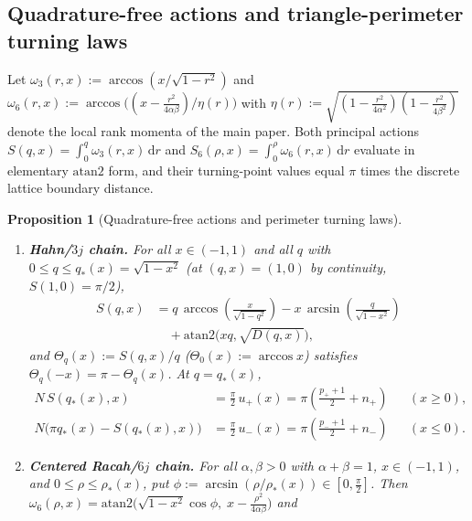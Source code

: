 \documentclass[11pt]{article}
\newtheorem{proposition}[theorem]{Proposition}
\theoremstyle{definition}
\theoremstyle{remark}
\newcommand{\dd}{\mathrm{d}}
\newcommand{\atanTwo}{\mathrm{atan2}}
\renewcommand{\_}{\oldunderscore\penalty0\hskip0pt\relax}
\begin{document}
\subsection{Quadrature-free actions and triangle-perimeter turning laws}
Let $\omega_3(r,x):=\arccos(x/\sqrt{1-r^2})$ and $\omega_6(r,x):=\arccos\bigl((x-\frac{r^2}{4\alpha\beta})/\eta(r)\bigr)$ with
  $\eta(r):=\sqrt{(1-\frac{r^2}{4\alpha^2})(1-\frac{r^2}{4\beta^2})}$ denote the local rank momenta of the main paper. Both principal
  actions $S(q,x)=\int_0^q\omega_3(r,x)\,\dd r$ and $S_6(\rho,x)=\int_0^\rho\omega_6(r,x)\,\dd r$ evaluate in elementary
  $\atanTwo$ form, and their turning-point values equal $\pi$ times the discrete lattice boundary distance.

\begin{proposition}[Quadrature-free actions and perimeter turning laws]
\label{prop:perimeter-laws}
\begin{enumerate}[label=(\alph*),leftmargin=2em,itemsep=3pt]
\item \textbf{Hahn/$3j$ chain.} For all $x\in(-1,1)$ and all $q$ with $0\le q\le q_*(x)=\sqrt{1-x^2}$ (at $(q,x)=(1,0)$ by continuity, $S(1,0)=\pi/2$),
\begin{equation}
  \begin{split}
  S(q,x) &= q\,\arccos\!\left(\frac{x}{\sqrt{1-q^2}}\right) - x\,\arcsin\!\left(\frac{q}{\sqrt{1-x^2}}\right)\\
  &\quad + \atanTwo\!\bigl(xq,\sqrt{D(q,x)}\bigr),
  \end{split}
  \label{eq:S3-closed}
\end{equation}
and $\Theta_q(x):=S(q,x)/q$ ($\Theta_0(x):=\arccos x$) satisfies $\Theta_q(-x)=\pi-\Theta_q(x)$. At $q=q_*(x)$,
\begin{equation}
\begin{aligned}
  N\,S(q_*(x),x) &= \frac{\pi}{2}\,u_+(x) = \pi\!\left(\frac{p_++1}{2}+n_+\right) && (x\ge 0),\\
  N\bigl(\pi q_*(x)-S(q_*(x),x)\bigr) &= \frac{\pi}{2}\,u_-(x) = \pi\!\left(\frac{p_-+1}{2}+n_-\right) && (x\le 0).
\end{aligned}
  \label{eq:3j-perimeter-law}
\end{equation}
\item \textbf{Centered Racah/$6j$ chain.} For all $\alpha,\beta>0$ with $\alpha+\beta=1$, $x\in(-1,1)$, and
  $0\le\rho\le\rho_*(x)$, put $\phi:=\arcsin(\rho/\rho_*(x))\in[0,\frac{\pi}{2}]$. Then
  $\omega_6(\rho,x)=\atanTwo\bigl(\sqrt{1-x^2}\cos\phi,\;x-\frac{\rho^2}{4\alpha\beta}\bigr)$ and
\begin{equation}

\end{equation}
\end{enumerate}
\end{proposition}
\end{document}
